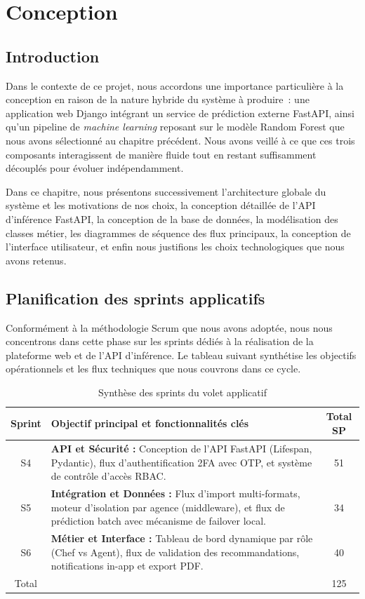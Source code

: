 \chapter{Conception}

\section{Introduction}

Dans le contexte de ce projet, nous accordons une importance
particulière à la conception en raison de la nature hybride du système à produire~:
une application web Django intégrant un service de prédiction externe
FastAPI, ainsi qu'un pipeline de \textit{machine learning} reposant sur le
modèle Random Forest que nous avons sélectionné au chapitre précédent. Nous avons veillé à ce que ces trois composants interagissent de manière fluide
tout en restant suffisamment découplés pour évoluer indépendamment.

Dans ce chapitre, nous présentons successivement l'architecture globale du système
et les motivations de nos choix, la conception détaillée de
l'API d'inférence FastAPI, la conception de la base de données, la
modélisation des classes métier, les diagrammes de séquence des flux
principaux, la conception de l'interface utilisateur, et enfin nous
justifions les choix technologiques que nous avons retenus.
\section{Planification des sprints applicatifs}

Conformément à la méthodologie Scrum que nous avons adoptée, nous nous concentrons dans cette phase sur les sprints dédiés à la réalisation de la plateforme web et de l'API d'inférence. Le tableau suivant synthétise les objectifs opérationnels et les flux techniques que nous couvrons dans ce cycle.

\begin{table}[htbp]
\centering
\caption{Synthèse des sprints du volet applicatif}
\label{tab:recap_sprints_applicatifs}
\begin{tabular}{|c|p{8cm}|c|}
\hline
Sprint & Objectif principal et fonctionnalités clés & Total SP \\
\hline
S4 & \textbf{API et Sécurité :} Conception de l'API FastAPI (Lifespan, Pydantic), flux d'authentification 2FA avec OTP, et système de contrôle d'accès RBAC. & 51 \\
\hline
S5 & \textbf{Intégration et Données :} Flux d'import multi-formats, moteur d'isolation par agence (middleware), et flux de prédiction batch avec mécanisme de failover local. & 34 \\
\hline
S6 & \textbf{Métier et Interface :} Tableau de bord dynamique par rôle (Chef vs Agent), flux de validation des recommandations, notifications in-app et export PDF. & 40 \\
\hline
Total & & 125 \\
\hline
\end{tabular}
\end{table}

